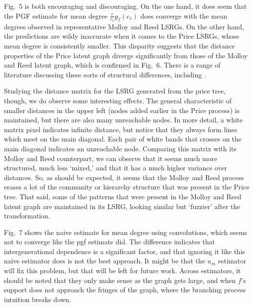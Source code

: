 \documentclass[12pt]{article}
\begin{document}
Fig.~5 is both encouraging and discouraging. On the one hand, it does seem that the PGF estimate for
mean degree $\frac{c}{c_r}g_f(c_r)$ does converge with the mean degrees observed in representative
Molloy and Reed LSRGs. On the other hand, the predictions are wildy inaccurate when it comes to
the Price LSRGs, whose mean degree is consistently smaller. This disparity suggests that the
distance properties of the Price latent graph diverge significantly from those of the Molloy and Reed
latent graph, which is confirmed in Fig.~6. There is a range of literature discussing these sorts
of structural differences, including \cite{GrisiFilho2013, Dommers2010, hofstad05}.\par

Studying the distance matrix for the LSRG generated from the price tree, though, we do observe
some interesting effects. The general characteristic of smaller distances in the upper left (nodes
added earlier in the Price process) is maintained, but there are also many unreachable nodes. In
more detail, a white matrix pixel indicates infinite distance, but notice that they always form
lines which meet on the main diagonal. Each pair of white bands that crosses on the main diagonal
indicates an unreachable node. Comparing this matrix with its Molloy and Reed counterpart, we
can observe that it seems much more structured, much less `mixed,' and that it has a much higher
variance over distances. So, as should be expected, it seems that the Molloy and Reed process
erases a lot of the community or hierarchy structure that was present in the Price tree. That said,
some of the patterns that were present in the Molloy and Reed latent graph are maintained in its
LSRG, looking similar but `fuzzier' after the transformation.\par

Fig.~7 shows the naive estimate for mean degree using convolutions, which seems not to converge
like the pgf estimate did. The difference indicates that intergenerational dependence is a significant
factor, and that ignoring it like this naive estimator does is not the best approach. It might
be that the $u_m$ estimator will fix this problem, but that will be left for future work.
Across estimators, it should be noted that they only make sense as the graph gets large, and
when $f$'s support does not approach the fringes of the graph, where the branching process
intuition breaks down.


\newpage
\clearpage


\end{document}
